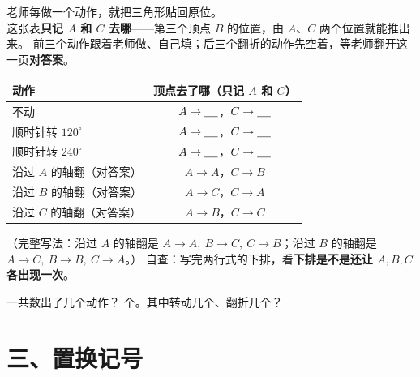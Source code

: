 \begin{dongshou}[边看边记]
  老师每做一个动作，就把三角形贴回原位。\\
  这张表\textbf{只记 \(A\) 和 \(C\) 去哪}——第三个顶点 \(B\) 的位置，由 \(A\)、\(C\) 两个位置就能推出来。
  前三个动作跟着老师做、自己填；后三个翻折的动作先空着，等老师翻开这一页\textbf{对答案}。

  \begin{center}
  \begin{tabular}{@{}lc@{}}
    \toprule
    动作 & 顶点去了哪（只记 \(A\) 和 \(C\)） \\
    \midrule
    不动 & \(A\to\underline{\hspace{1.2em}}\)，\(C\to\underline{\hspace{1.2em}}\) \\[4pt]
    顺时针转 \(120^\circ\) & \(A\to\underline{\hspace{1.2em}}\)，\(C\to\underline{\hspace{1.2em}}\) \\[4pt]
    顺时针转 \(240^\circ\) & \(A\to\underline{\hspace{1.2em}}\)，\(C\to\underline{\hspace{1.2em}}\) \\[4pt]
    \midrule
    沿过 \(A\) 的轴翻（对答案） & \(A\to A\)，\(C\to B\) \\[4pt]
    沿过 \(B\) 的轴翻（对答案） & \(A\to C\)，\(C\to A\) \\[4pt]
    沿过 \(C\) 的轴翻（对答案） & \(A\to B\)，\(C\to C\) \\
    \bottomrule
  \end{tabular}
  \end{center}
  （完整写法：沿过 \(A\) 的轴翻是 \(A\to A,\ B\to C,\ C\to B\)；沿过 \(B\) 的轴翻是 \(A\to C,\ B\to B,\ C\to A\)。）
  自查：写完两行式的下排，看\textbf{下排是不是还让 \(A,B,C\) 各出现一次}。
\end{dongshou}

\begin{sikao}
  一共数出了几个动作？\underline{\hspace{2em}} 个。其中转动几个、翻折几个？
\end{sikao}

\section*{三、置换记号}

